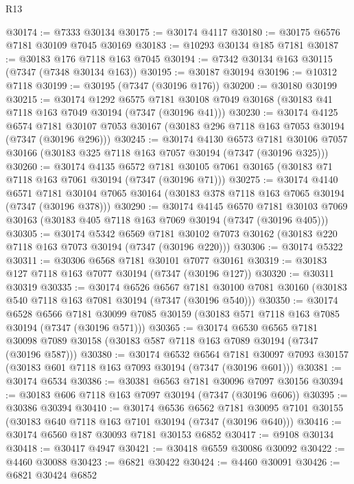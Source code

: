 \begin{lexlean}{R13}
\begin{coremodule}
@30174 := @7333 @30134
@30175 := @30174 @4117
@30180 := @30175 @6576 @7181 @30109 @7045 @30169
@30183 := @10293 @30134 @185 @7181
@30187 := @30183 @176 @7118 @163 @7045
@30194 := @7342 @30134 @163 @30115 (@7347 (@7348 @30134 @163))
@30195 := @30187 @30194
@30196 := @10312 @7118
@30199 := @30195 (@7347 (@30196 @176))
@30200 := @30180 @30199
@30215 := @30174
    @1292
    @6575
    @7181
    @30108
    @7049
    @30168
    (@30183 @41 @7118 @163 @7049 @30194 (@7347 (@30196 @41)))
@30230 := @30174
    @4125
    @6574
    @7181
    @30107
    @7053
    @30167
    (@30183 @296 @7118 @163 @7053 @30194 (@7347 (@30196 @296)))
@30245 := @30174
    @4130
    @6573
    @7181
    @30106
    @7057
    @30166
    (@30183 @325 @7118 @163 @7057 @30194 (@7347 (@30196 @325)))
@30260 := @30174
    @4135
    @6572
    @7181
    @30105
    @7061
    @30165
    (@30183 @71 @7118 @163 @7061 @30194 (@7347 (@30196 @71)))
@30275 := @30174
    @4140
    @6571
    @7181
    @30104
    @7065
    @30164
    (@30183 @378 @7118 @163 @7065 @30194 (@7347 (@30196 @378)))
@30290 := @30174
    @4145
    @6570
    @7181
    @30103
    @7069
    @30163
    (@30183 @405 @7118 @163 @7069 @30194 (@7347 (@30196 @405)))
@30305 := @30174
    @5342
    @6569
    @7181
    @30102
    @7073
    @30162
    (@30183 @220 @7118 @163 @7073 @30194 (@7347 (@30196 @220)))
@30306 := @30174 @5322
@30311 := @30306 @6568 @7181 @30101 @7077 @30161
@30319 := @30183 @127 @7118 @163 @7077 @30194 (@7347 (@30196 @127))
@30320 := @30311 @30319
@30335 := @30174
    @6526
    @6567
    @7181
    @30100
    @7081
    @30160
    (@30183 @540 @7118 @163 @7081 @30194 (@7347 (@30196 @540)))
@30350 := @30174
    @6528
    @6566
    @7181
    @30099
    @7085
    @30159
    (@30183 @571 @7118 @163 @7085 @30194 (@7347 (@30196 @571)))
@30365 := @30174
    @6530
    @6565
    @7181
    @30098
    @7089
    @30158
    (@30183 @587 @7118 @163 @7089 @30194 (@7347 (@30196 @587)))
@30380 := @30174
    @6532
    @6564
    @7181
    @30097
    @7093
    @30157
    (@30183 @601 @7118 @163 @7093 @30194 (@7347 (@30196 @601)))
@30381 := @30174 @6534
@30386 := @30381 @6563 @7181 @30096 @7097 @30156
@30394 := @30183 @606 @7118 @163 @7097 @30194 (@7347 (@30196 @606))
@30395 := @30386 @30394
@30410 := @30174
    @6536
    @6562
    @7181
    @30095
    @7101
    @30155
    (@30183 @640 @7118 @163 @7101 @30194 (@7347 (@30196 @640)))
@30416 := @30174 @6560 @187 @30093 @7181 @30153 @6852
@30417 := @9108 @30134
@30418 := @30417 @4947
@30421 := @30418 @6559 @30086 @30092
@30422 := @4460 @30088
@30423 := @6821 @30422
@30424 := @4460 @30091
@30426 := @6821 @30424 @6852

\end{coremodule}
\end{lexlean}
